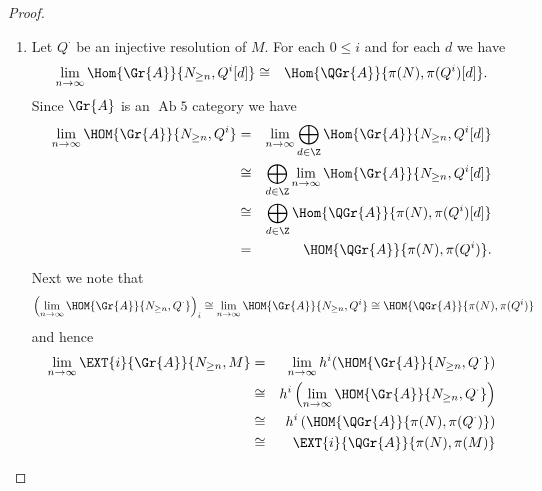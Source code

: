 \documentclass[10pt]{amsart}
\begin{document}
\begin{prop}
  \begin{proof}
    \begin{enumerate}
    \item
      Let $Q^\cdot$ be an injective resolution of $M$.
      For each $0 \leq i$ and for each $d$ we have 
      \begin{eqnarray*}
        \lim_{n \rightarrow \infty}\Hom{\Gr{A}}{N_{\geq n}, Q^i[d]} &\cong& 
        \Hom{\QGr{A}}{\pi(N), \pi(Q^i)[d]}.
      \end{eqnarray*}
      Since $\Gr{A}$ is an $\operatorname{Ab} 5$ category we have
      \begin{eqnarray*}
        \lim_{n \rightarrow \infty}\HOM{\Gr{A}}{N_{\geq n}, Q^i} &=&
        \lim_{n \rightarrow \infty}\bigoplus_{d \in \Z} \Hom{\Gr{A}}{N_{\geq n}, Q^i[d]}\\
        &\cong& \bigoplus_{d \in \Z} \lim_{n \rightarrow \infty}\Hom{\Gr{A}}{N_{\geq n}, Q^i[d]}\\
        &\cong& \bigoplus_{d \in \Z} \Hom{\QGr{A}}{\pi(N), \pi(Q^i)[d]}\\
        &=&\HOM{\QGr{A}}{\pi(N), \pi(Q^i)}.
      \end{eqnarray*}
      Next we note that
      $$\left(\lim_{n \rightarrow \infty} \HOM{\Gr{A}}{N_{\geq n}, Q^\cdot}\right)_i \cong \lim_{n \rightarrow \infty}\HOM{\Gr{A}}{N_{\geq n}, Q^i} \cong \HOM{\QGr{A}}{\pi(N), \pi(Q^i)}$$ and hence
      \begin{eqnarray*}
        \lim_{n \rightarrow \infty} \EXT{i}{\Gr{A}}{N_{\geq n}, M} &=& 
        \lim_{n \rightarrow \infty} h^i(\HOM{\Gr{A}}{N_{\geq n}, Q^\cdot})\\
        &\cong& h^i\left(\lim_{n \rightarrow \infty} \HOM{\Gr{A}}{N_{\geq n}, Q^\cdot}\right)\\
        &\cong& h^i\left(\HOM{\QGr{A}}{\pi(N), \pi(Q^\cdot)}\right)\\
        &\cong& \EXT{i}{\QGr{A}}{\pi(N), \pi(M)}
      \end{eqnarray*}

\end{enumerate}
\end{proof}
\end{prop}
\end{document}

